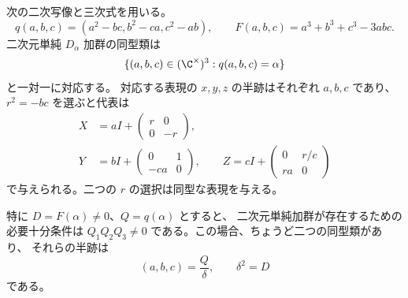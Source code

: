 \begin{proposition}[半跡による全二次元単純加群の分類]
\label{cmo:prop:two-dimensional-classification}
次の二次写像と三次式を用いる。
\[
 q(a,b,c)=(a^2-bc,b^2-ca,c^2-ab),\qquad
 F(a,b,c)=a^3+b^3+c^3-3abc.
\]
二次元単純 $D_\alpha$ 加群の同型類は
\begin{equation}\label{cmo:eq:two-dimensional-fibre}
 \{(a,b,c)\in(\C^\times)^3:q(a,b,c)=\alpha\}
\end{equation}
と一対一に対応する。
対応する表現の $x,y,z$ の半跡はそれぞれ $a,b,c$ であり、
$r^2=-bc$ を選ぶと代表は
\begin{equation}\label{cmo:eq:two-dimensional-matrices}
 \begin{split}
 X&=aI+\begin{pmatrix}r&0\\0&-r\end{pmatrix},\\
 Y&=bI+\begin{pmatrix}0&1\\-ca&0\end{pmatrix},\qquad
 Z=cI+\begin{pmatrix}0&r/c\\ra&0\end{pmatrix}
 \end{split}
\end{equation}
で与えられる。二つの $r$ の選択は同型な表現を与える。

特に $D=F(\alpha)\ne0$、$Q=q(\alpha)$ とすると、
二次元単純加群が存在するための必要十分条件は
$Q_1Q_2Q_3\ne0$ である。この場合、ちょうど二つの同型類があり、
それらの半跡は
\begin{equation}\label{cmo:eq:two-dimensional-inversion}
 (a,b,c)=\frac{Q}{\delta},\qquad \delta^2=D
\end{equation}
である。
\end{proposition}

